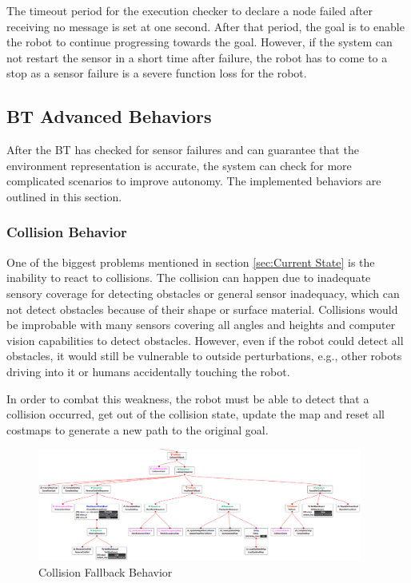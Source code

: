 The timeout period for the execution checker to declare a node failed after receiving no message is set at one second. After that period, the goal is to enable the robot to continue progressing towards the goal. However, if the system can not restart the sensor in a short time after failure, the robot has to come to a stop as a sensor failure is a severe function loss for the robot.

\subsection{BT Advanced Behaviors}

After the BT has checked for sensor failures and can guarantee that the environment representation is accurate, the system can check for more complicated scenarios to improve autonomy. The implemented behaviors are outlined in this section. 

\subsubsection{Collision Behavior}

One of the biggest problems mentioned in section \ref{sec:Current State} is the inability to react to collisions. The collision can happen due to inadequate sensory coverage for detecting obstacles or general sensor inadequacy, which can not detect obstacles because of their shape or surface material. Collisions would be improbable with many sensors covering all angles and heights and computer vision capabilities to detect obstacles. However, even if the robot could detect all obstacles, it would still be vulnerable to outside perturbations, e.g., other robots driving into it or humans accidentally touching the robot. 

In order to combat this weakness, the robot must be able to detect that a collision occurred, get out of the collision state, update the map and reset all costmaps to generate a new path to the original goal. 

\begin{figure}[ht]
	\centering
	\includegraphics[width=0.95\textwidth]{images/collision_fallback_inverted.png}
	\caption{Collision Fallback Behavior}
	\label{fig:collision_fallback}
\end{figure}

